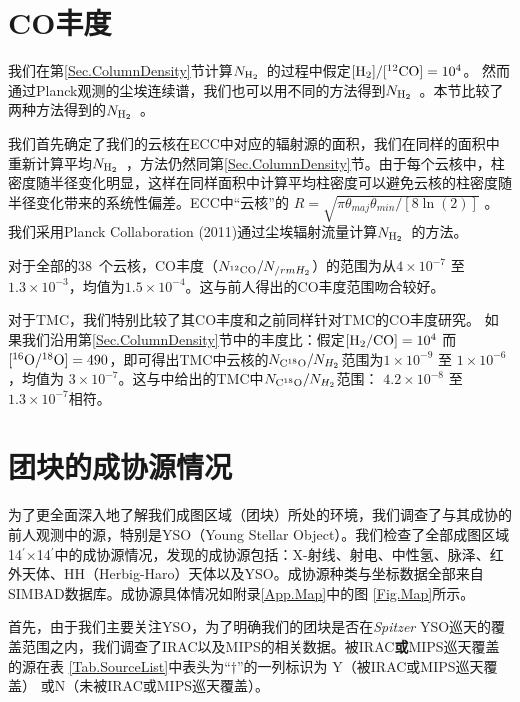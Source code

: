 \documentclass[UTF8, nocolorlinks]{pkuthss}
\newcommand{\nhyd}{$N_{\rm H_2}$\ }
\newcommand{\arcmin}{$^{\prime}$}
\newcommand{\numcore}{38\ }
\begin{document}
	\section{CO丰度}

		我们在第\ref{Sec.ColumnDensity}节计算\nhyd 的过程中假定$\rm [H_2]/[ ^{12}CO]=10^4$。 然而通过Planck观测的尘埃连续谱，我们也可以用不同的方法得到\nhyd 。本节比较了两种方法得到的\nhyd 。

		我们首先确定了我们的云核在ECC中对应的辐射源的面积，我们在同样的面积中重新计算平均\nhyd ，方法仍然同第\ref{Sec.ColumnDensity}节。由于每个云核中，柱密度随半径变化明显，这样在同样面积中计算平均柱密度可以避免云核的柱密度随半径变化带来的系统性偏差。ECC中“云核”的 $R=\sqrt{\pi\theta_{maj}\theta_{min}/[8\ln(2)]}$ 。我们采用Planck Collaboration (2011)通过尘埃辐射流量计算\nhyd 的方法\supercite{2011A&A...536A..23P}。

		对于全部的\numcore 个云核，CO丰度（$N_{^{12}\rm CO}/N_{/rmH_2}$）的范围为从$4\times 10^{-7}$ 至$1.3\times 10^{-3 }$，均值为$1.5\times 10^{-4}$。这与前人得出的CO丰度范围吻合较好\supercite{1988ApJ...334..771V}。

		对于TMC，我们特别比较了其CO丰度和之前同样针对TMC的CO丰度研究\supercite{1982ApJ...262..590F}。 如果我们沿用第\ref{Sec.ColumnDensity}节中的丰度比\supercite{1991ApJ...374..540G}：假定$\rm [H_2/CO] = 10^4$ 而 $\rm [^{16}O/^{18}O]=490$，即可得出TMC中云核的$N_{\rm C^{18}O}/N_{H_2}$范围为$1\times 10^{-9}$ 至 $1\times 10^{-6 }$，均值为 $3\times 10^{-7}$。这与\parencite{1982ApJ...262..590F}中给出的TMC中$N_{\rm C^{18}O}/N_{H_2}$范围： $4.2\times 10^{-8}$ 至 $1.3\times 10^{-7}$相符。

	\section{团块的成协源情况}

		为了更全面深入地了解我们成图区域（团块）所处的环境，我们调查了与其成协的前人观测中的源，特别是YSO（Young Stellar Object）。我们检查了全部成图区域14\arcmin$\times$14\arcmin 中的成协源情况，发现的成协源包括：X-射线、射电、中性氢、脉泽、红外天体、HH（Herbig-Haro）天体以及YSO。成协源种类与坐标数据全部来自SIMBAD数据库\supercite{2007ASPC..377..197W}。成协源具体情况如附录\ref{App.Map}中的图 \ref{Fig.Map}所示。

		首先，由于我们主要关注YSO，为了明确我们的团块是否在\emph{Spitzer} YSO巡天的覆盖范围之内，我们调查了IRAC以及MIPS的相关数据\supercite{2010ApJS..186..259R}。被IRAC\textbf{或}MIPS巡天覆盖的源在表 \ref{Tab.SourceList}中表头为“$\dagger$”的一列标识为 Y（被IRAC或MIPS巡天覆盖） 或N（未被IRAC或MIPS巡天覆盖）。
\end{document}
